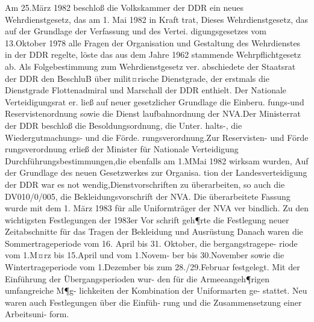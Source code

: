 

Am 25.März 1982 beschloß die Volkskammer der
DDR ein neues Wehrdienstgesetz, das am 1. Mai
1982 in Kraft trat, Dieses Wehrdienstgesetz, das
auf der Grundlage der Verfassung und des Vertei.
digungsgesetzes vom 13.Oktober 1978 alle Fragen
der Organisation und Gestaltung des Wehrdienstes
in der DDR regelte, löste das aus dem Jahre 1962
stammende Wehrpflichtgesetz ab.
Als Folgebestimmung zum Wehrdienstgesetz ver.
abschiedete der Staatsrat der DDR den BeschluB
über milit¤rische Dienstgrade, der erstmals die
Dienstgrade Flottenadmiral und Marschall der
DDR enthielt. Der Nationale Verteidigungsrat er.
ließ auf neuer gesetzlicher Grundlage die Einberu.
fungs-und Reservistenordnung sowie die Dienst
laufbahnordnung der NVA.Der Ministerrat der
DDR beschloß die Besoldungsordnung, die Unter.
halts-, die Wiedergutmachungs- und die Förde.
rungsverordnung.Zur Reservisten- und Förde
rungsverordnung erließ der Minister für Nationale
Verteidigung Durchführungsbestimmungen,die
ebenfalls am 1.MMai 1982 wirksam wurden, Auf der
Grundlage des neuen Gesetzwerkes zur Organisa.
tion der Landesverteidigung der DDR war es not
wendig,Dienstvorschriften zu überarbeiten, so auch
die DV010/0/005, die Bekleidungsvorschrift der
NVA. Die überarbeitete Fassung wurde mit dem
1. März 1983 für alle Uniformträger der NVA ver
bindlich.
Zu den wichtigsten Festlegungen der 1983er Vor
schrift geh¶rte die Festlegung neuer Zeitabschnitte
für das Tragen der Bekleidung und Ausrüstung
Danach
waren die Sommertrageperiode vom 16. April bis 31. Oktober, die bergangstragepe-
riode vom 1.M¤rz bis 15.April und vom 1.Novem-
ber bis 30.November sowie die Wintertrageperiode
vom 1.Dezember bis zum 28./29.Februar festgelegt.
Mit der Einführung der Übergangsperioden wur-
den für die Armeeangeh¶rigen umfangreiche M¶g-
lichkeiten der Kombination der Uniformarten ge-
stattet.
Neu waren auch Festlegungen über die Einfüh-
rung und die Zusammensetzung
einer Arbeitsuni-
form.